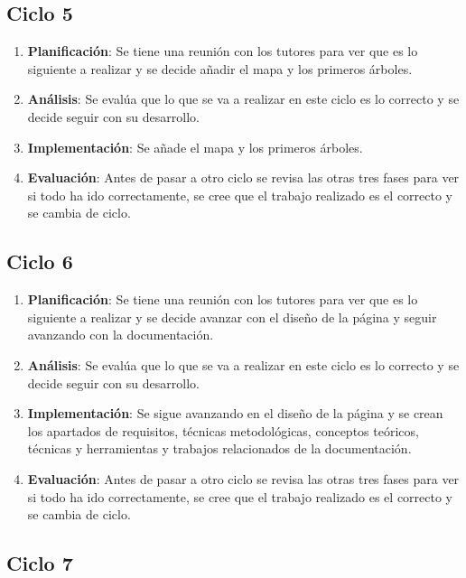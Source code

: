 \subsection{Ciclo 5}

\begin{enumerate}
	\item \textbf{Planificación}: Se tiene una reunión con los tutores para ver que es lo siguiente a realizar y se decide añadir el mapa y los primeros árboles.
	\item \textbf{Análisis}: Se evalúa que lo que se va a realizar en este ciclo es lo correcto y se decide seguir con su desarrollo.
	\item \textbf{Implementación}: Se añade el mapa y los primeros árboles.
	\item \textbf{Evaluación}: Antes de pasar a otro ciclo se revisa las otras tres fases para ver si todo ha ido correctamente, se cree que el trabajo realizado es el correcto y se cambia de ciclo.
\end{enumerate}

\subsection{Ciclo 6}

\begin{enumerate}
	\item \textbf{Planificación}: Se tiene una reunión con los tutores para ver que es lo siguiente a realizar y se decide avanzar con el diseño de la página y seguir avanzando con la documentación.
	\item \textbf{Análisis}: Se evalúa que lo que se va a realizar en este ciclo es lo correcto y se decide seguir con su desarrollo.
	\item \textbf{Implementación}: Se sigue avanzando en el diseño de la página y se crean los apartados de requisitos, técnicas metodológicas, conceptos teóricos, técnicas y herramientas y trabajos relacionados de la documentación.
	\item \textbf{Evaluación}: Antes de pasar a otro ciclo se revisa las otras tres fases para ver si todo ha ido correctamente, se cree que el trabajo realizado es el correcto y se cambia de ciclo.
\end{enumerate}

\subsection{Ciclo 7}

